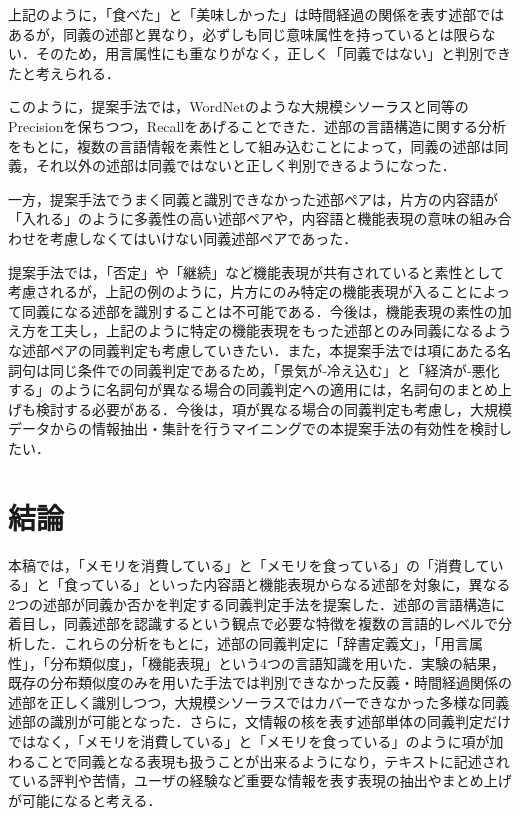 \documentclass[japanese]{jnlp_1.4}
\begin{document}
上記のように，「食べた」と「美味しかった」は時間経過の関係を表す述部ではあるが，同義の述部と異なり，必ずしも同じ意味属性を持っているとは限らない．そのため，用言属性にも重なりがなく，正しく「同義ではない」と判別できたと考えられる．

このように，提案手法では，WordNetのような大規模シソーラスと同等のPrecisionを保ちつつ，Recallをあげることできた．述部の言語構造に関する分析をもとに，複数の言語情報を素性として組み込むことによって，同義の述部は同義，それ以外の述部は同義ではないと正しく判別できるようになった．

一方，提案手法でうまく同義と識別できなかった述部ペアは，片方の内容語が「入れる」のように多義性の高い述部ペアや，内容語と機能表現の意味の組み合わせを考慮しなくてはいけない同義述部ペアであった．

提案手法では，「否定」や「継続」など機能表現が共有されていると素性として考慮されるが，上記の例のように，片方にのみ特定の機能表現が入ることによって同義になる述部を識別することは不可能である．今後は，機能表現の素性の加え方を工夫し，上記のように特定の機能表現をもった述部とのみ同義になるような述部ペアの同義判定も考慮していきたい．また，本提案手法では項にあたる名詞句は同じ条件での同義判定であるため，「景気が‐冷え込む」と「経済が‐悪化する」のように名詞句が異なる場合の同義判定への適用には，名詞句のまとめ上げも検討する必要がある．今後は，項が異なる場合の同義判定も考慮し，大規模データからの情報抽出・集計を行うマイニングでの本提案手法の有効性を検討したい．


\section{結論}

本稿では，「メモリを消費している」と「メモリを食っている」の「消費している」と「食っている」といった内容語と機能表現からなる述部を対象に，異なる2つの述部が同義か否かを判定する同義判定手法を提案した．述部の言語構造に着目し，同義述部を認識するという観点で必要な特徴を複数の言語的レベルで分析した．これらの分析をもとに，述部の同義判定に「辞書定義文」，「用言属性」，「分布類似度」，「機能表現」という4つの言語知識を用いた．実験の結果，既存の分布類似度のみを用いた手法では判別できなかった反義・時間経過関係の述部を正しく識別しつつ，大規模シソーラスではカバーできなかった多様な同義述部の識別が可能となった．さらに，文情報の核を表す述部単体の同義判定だけではなく，「メモリを消費している」と「メモリを食っている」のように項が加わることで同義となる表現も扱うことが出来るようになり，テキストに記述されている評判や苦情，ユーザの経験など重要な情報を表す表現の抽出やまとめ上げが可能になると考える．
\end{document}
